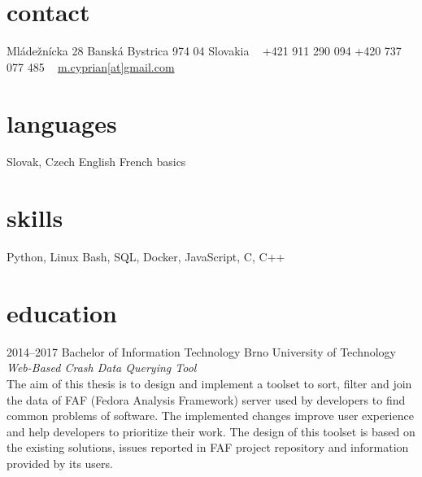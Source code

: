 \documentclass[]{friggeri-cv} %
\begin{document}


\begin{aside} %
\section{contact}
Mládežnícka 28
Banská Bystrica 974 04
Slovakia
~
+421 911 290 094
+420 737 077 485
~
\href{mailto:m.cyprian@gmail.com}{m.cyprian[at]gmail.com}
\section{languages}
Slovak, Czech
English
French basics
\section{skills}
Python, Linux
Bash, SQL, Docker, JavaScript, C, C++
\end{aside}


\section{education}

\begin{entrylist}


\entry
{2014--2017}
{Bachelor {\normalfont of Information Technology}}
{Brno University of Technology}
{\emph{Web-Based Crash Data Querying Tool} \\ The aim of this thesis is to design and implement a toolset to sort, filter and join the data of FAF (Fedora Analysis Framework) server used by developers to find common problems of software. The implemented changes improve user experience and help developers to prioritize their work. The design of this toolset is based on the existing solutions, issues reported in FAF project repository and information provided by its users.}

\end{entrylist}
\end{document}
